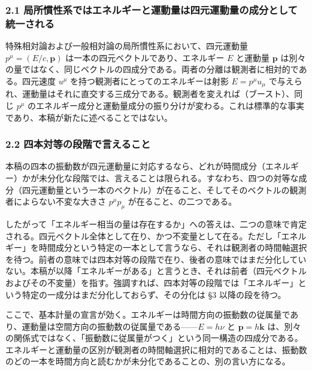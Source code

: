 \documentclass[
]{ltjsarticle}
\begin{document}
\subsubsection{2.1
局所慣性系ではエネルギーと運動量は四元運動量の成分として統一される}\label{ux5c40ux6240ux6163ux6027ux7cfbux3067ux306fux30a8ux30cdux30ebux30aeux30fcux3068ux904bux52d5ux91cfux306fux56dbux5143ux904bux52d5ux91cfux306eux6210ux5206ux3068ux3057ux3066ux7d71ux4e00ux3055ux308cux308b}

特殊相対論および一般相対論の局所慣性系において、四元運動量
\(p^\mu=(E/c,\boldsymbol{p})\) は一本の四元ベクトルであり、エネルギー
\(E\) と運動量 \(\boldsymbol{p}\)
は別々の量ではなく、同じベクトルの四成分である。両者の分離は観測者に相対的である。四元速度
\(u^\mu\) を持つ観測者にとってのエネルギーは射影 \(E=p^\mu u_\mu\)
で与えられ、運動量はそれに直交する三成分である。観測者を変えれば（ブースト）、同じ
\(p^\mu\)
のエネルギー成分と運動量成分の振り分けが変わる。これは標準的な事実であり、本稿が新たに述べることではない。

\subsubsection{2.2
四本対等の段階で言えること}\label{ux56dbux672cux5bfeux7b49ux306eux6bb5ux968eux3067ux8a00ux3048ux308bux3053ux3068}

本稿の四本の振動数が四元運動量に対応するなら、どれが時間成分（エネルギー）かが未分化な段階では、言えることは限られる。すなわち、四つの対等な成分（四元運動量という一本のベクトル）が在ること、そしてそのベクトルの観測者によらない不変な大きさ
\(p^\mu p_\mu\) が在ること、の二つである。

したがって「エネルギー相当の量は存在するか」への答えは、二つの意味で肯定される。四元ベクトル全体として在り、かつ不変量として在る。ただし「エネルギー」を時間成分という特定の一本として言うなら、それは観測者の時間軸選択を待つ。前者の意味では四本対等の段階で在り、後者の意味ではまだ分化していない。本稿が以降「エネルギーがある」と言うとき、それは前者（四元ベクトルおよびその不変量）を指す。強調すれば、四本対等の段階では「エネルギー」という特定の一成分はまだ分化しておらず、その分化は
§3 以降の段を待つ。

ここで、基本計量の宣言が効く。エネルギーは時間方向の振動数の従属量であり、運動量は空間方向の振動数の従属量である------\(E=h\nu\)
と \(\boldsymbol{p}=h\boldsymbol{k}\)
は、別々の関係式ではなく、「振動数に従属量がつく」という同一構造の四成分である。エネルギーと運動量の区別が観測者の時間軸選択に相対的であることは、振動数のどの一本を時間方向と読むかが未分化であることの、別の言い方になる。
\end{document}
